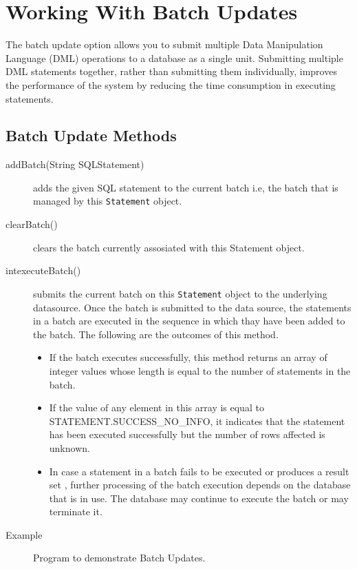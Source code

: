 \documentclass[11pt,a4paper]{article}
\begin{document}
\section*{Working With Batch Updates}
The batch update option allows you to submit multiple Data Manipulation Language (DML) operations to a database as a single unit. Submitting multiple DML statements together, rather than submitting them individually, improves the performance of the system by reducing the time consumption in executing statements.

\subsection*{Batch Update Methods}
\begin{description}
    \item[addBatch(String SQLStatement)] adds the given SQL statement to the current batch i.e, the batch that is managed by this \texttt{Statement} object.
    \item[clearBatch()] clears the batch currently assosiated with this Statement object.
    \item[int\lbrack\rbrack executeBatch()] submits the current batch on this \texttt{Statement} object to the underlying datasource. Once the batch is submitted to the data source, the statements in a batch are executed in the sequence in which thay have been added to the batch. The following are the outcomes of this method.
        \begin{itemize}
            \item If the batch executes successfully, this method returns an array of integer values whose length is equal to the number of statements in the batch.
            \item If the value of any element in this array is equal to STATEMENT.SUCCESS\_NO\_INFO, it indicates that the statement has been executed successfully but the number of rows affected is unknown.
            \item In case a statement in a batch fails to be executed or produces a result set , further processing of the batch execution depends on the database that is in use. The database may continue to execute the batch or may terminate it.
        \end{itemize}
\end{description}


\begin{description}
\item[Example] Program to demonstrate Batch Updates.

\end{description}
\end{document}
